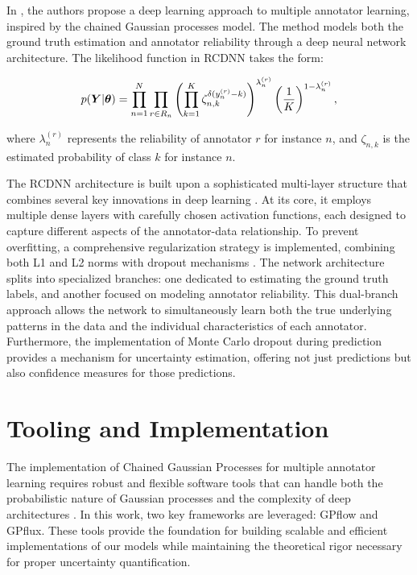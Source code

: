In \cite{GilGonzalezEtAl2021-RCDNN}, the authors propose a deep
learning approach to multiple annotator learning, inspired by the
chained Gaussian processes model. The method models both the ground
truth estimation and annotator reliability through a deep neural
network architecture. The likelihood function in \gls{RCDNN} takes the form:

\begin{align}
  p({\bm{Y}}|\bm{\theta}) = \prod_{n=1}^{N}\prod_{r\in R_n}
  \left(\prod_{k=1}^{K}\zeta_{n,k}^{\delta(y_n^{(r)}-k)}\right)^{\lambda_n^{(r)}}\left(\frac{1}{K}\right)^{1-\lambda_n^{(r)}},
\end{align}

where $\lambda_n^{(r)}$ represents the reliability of annotator $r$
for instance $n$, and $\zeta_{n,k}$ is the estimated probability of
class $k$ for instance $n$.

The \gls{RCDNN} architecture is built upon a sophisticated multi-layer
structure that combines several key innovations in deep learning
\cite{GilGonzalezEtAl2021-RCDNN}. At its core, it employs multiple dense
layers with carefully chosen activation functions, each designed to
capture different aspects of the annotator-data relationship. To prevent
overfitting, a comprehensive regularization strategy is implemented,
combining both L1 and L2 norms with dropout mechanisms
\cite{GilGonzalezEtAl2021-RCDNN}. The network architecture
splits into specialized branches: one dedicated to estimating the
ground truth labels, and another focused on modeling annotator
reliability. This dual-branch approach allows the network to
simultaneously learn both the true underlying patterns in the data
and the individual characteristics of each annotator. Furthermore,
the implementation of Monte Carlo dropout during prediction provides
a mechanism for uncertainty estimation, offering not just predictions
but also confidence measures for those predictions.

\section{Tooling and Implementation}\label{sec:tooling}

The implementation of Chained Gaussian Processes for multiple
annotator learning requires robust and flexible software tools that
can handle both the probabilistic nature of Gaussian processes and
the complexity of deep architectures \cite{SaulEtAl2016}.
In this work, two key frameworks are leveraged: GPflow and
GPflux. These tools provide the foundation for building scalable and
efficient implementations of our models while maintaining the
theoretical rigor necessary for proper uncertainty quantification.

